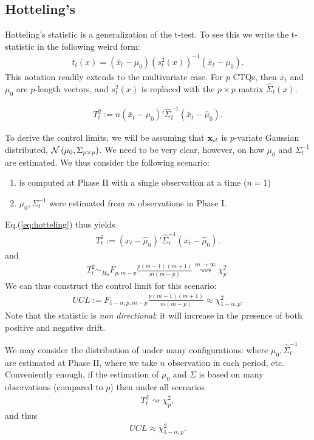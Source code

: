 \subsection{Hotteling's \tsq}
Hotteling's \tsq statistic is a generalization of the t-test.
To see this we write the t-statistic in the following weird form:
\begin{align}
	t_t(x)=(\bar{x}_t-\mu_0) (s^2_t(x))^{-1} (\bar{x}_t-\mu_0).
\end{align}
This notation readily extends to the multivariate case. 
For $p$ CTQs, then $\bar{x}_t$ and $\mu_0$ are $p$-length vectors, and $s^2_t(x)$ is replaced with the $p \times p$ matrix $\hat{\Sigma}_t(x)$.
\begin{definition}
\begin{align}
\label{eq:hotteling}
	T^2_t := n (\bar{x}_t-\hat{\mu}_0)' \hat{\Sigma}_t^{-1} (\bar{x}_t-\hat{\mu}_0).
\end{align}
\end{definition}
To derive the control limits, we will be assuming that $\mathbf{x}_{it}$ is $p$-variate Gaussian distributed, $\mathcal{N}\left(\mu_0, \Sigma_{p \times p}\right)$. 
We need to be very clear, however, on how $\mu_0$ and $\Sigma_t^{-1}$ are estimated. 
We thus consider the following scenario:
\begin{enumerate}
\item \tsq is computed at Phase II with a single observation at a time ($n=1$)
\item $\mu_0,{\Sigma}_t^{-1}$ were estimated from $m$ observations in Phase I.
\end{enumerate}
Eq.(\ref{eq:hotteling}) thus yields 
\begin{align}
	T^2_t := (x_t-\hat{\mu}_0)' \hat{\Sigma}_t^{-1} (x_t-\hat{\mu}_0).
\end{align}
and 
\begin{align}
	T^2_t \sim_{H_0} F_{p,m-p} \frac{p(m-1)(m+1)}{m(m-p)} \overset{m \to \infty}{\rightsquigarrow }\chi^2_p.
\end{align}
We can thus construct the control limit for this scenario:
\begin{align}
	UCL:= F_{1-\alpha,p,m-p} \frac{p(m-1)(m+1)}{m(m-p)} \approx \chi^2_{1-\alpha,p}.
\end{align}
Note that the \tsq statistic is \emph{non directional}: it will increase in the presence of both positive and negative drift. 

We may consider the distribution of \tsq under many configurations: where $\mu_0,\hat{\Sigma}_t^{-1}$ are estimated at Phase II, where we take $n$ observation in each period, etc. 
Conveniently enough, if the estimation of $\mu_0$ and $\Sigma$ is based on many observations (compared to $p$) then under all scenarios
\begin{align}
	T^2_t  \rightsquigarrow \chi^2_p,
\end{align}
and thus
\begin{align}
	UCL \approx \chi^2_{1-\alpha,p}.
\end{align}

